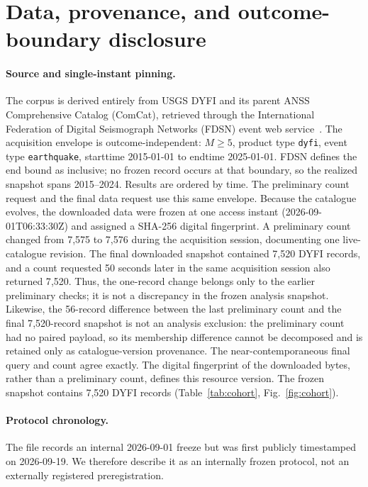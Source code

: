 \documentclass[pdflatex,sn-basic,iicol]{sn-jnl}
\begin{document}
\section{Data, provenance, and outcome-boundary disclosure}\label{sec:data}

\paragraph{Source and single-instant pinning.} The corpus is derived entirely
from USGS DYFI and its parent ANSS Comprehensive Catalog (ComCat), retrieved
through the International Federation of Digital Seismograph Networks (FDSN)
event web service~\citep{usgs_dyfi_data,usgs_comcat}. The
acquisition envelope is outcome-independent: $M\geq5$, product type
\texttt{dyfi}, event type \texttt{earthquake}, starttime 2015-01-01 to endtime
2025-01-01. FDSN defines the end bound as inclusive; no frozen record occurs
at that boundary, so the realized snapshot spans 2015--2024. Results are ordered
by time. The preliminary count request and the final data request use this same
envelope. Because the catalogue evolves, the downloaded data were frozen at one
access instant (2026-09-01T06:33:30Z) and assigned a SHA-256 digital
fingerprint. A preliminary count changed from 7{,}575 to 7{,}576 during the
acquisition session, documenting one live-catalogue revision. The final
downloaded snapshot contained 7{,}520 DYFI records, and a count requested
50 seconds later in the same acquisition session also returned 7{,}520. Thus,
the one-record change belongs only to
the earlier preliminary checks; it is not a discrepancy in the frozen analysis
snapshot. Likewise, the 56-record difference between the last preliminary count
and the final 7{,}520-record snapshot is not an analysis exclusion: the
preliminary count had no paired payload, so its membership difference cannot be
decomposed and is retained only as catalogue-version provenance. The
near-contemporaneous final query and count agree exactly. The digital
fingerprint of the downloaded bytes, rather than a
preliminary count, defines this resource version. The frozen snapshot
contains 7{,}520 DYFI records (Table~\ref{tab:cohort}, Fig.~\ref{fig:cohort}).

\paragraph{Protocol chronology.} The file records an internal 2026-09-01 freeze
but was first publicly timestamped on 2026-09-19. We therefore describe it as an
internally frozen protocol, not an externally registered preregistration.
\end{document}
